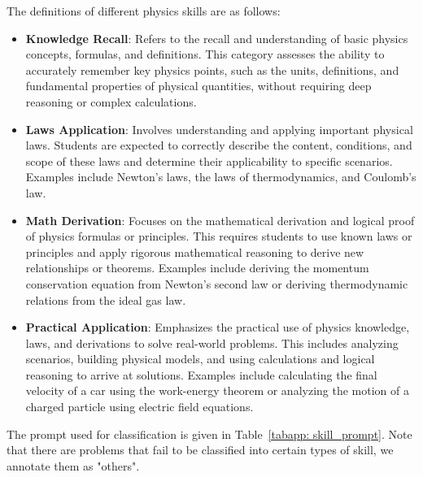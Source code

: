 The definitions of different physics skills are as follows:
\begin{itemize}
    \item \textbf{Knowledge Recall}: Refers to the recall and understanding of basic physics concepts, formulas, and definitions. This category assesses the ability to accurately remember key physics points, such as the units, definitions, and fundamental properties of physical quantities, without requiring deep reasoning or complex calculations.
    \item \textbf{Laws Application}: Involves understanding and applying important physical laws. Students are expected to correctly describe the content, conditions, and scope of these laws and determine their applicability to specific scenarios. Examples include Newton's laws, the laws of thermodynamics, and Coulomb's law.
    \item \textbf{Math Derivation}: Focuses on the mathematical derivation and logical proof of physics formulas or principles. This requires students to use known laws or principles and apply rigorous mathematical reasoning to derive new relationships or theorems. Examples include deriving the momentum conservation equation from Newton's second law or deriving thermodynamic relations from the ideal gas law.
    \item \textbf{Practical Application}: Emphasizes the practical use of physics knowledge, laws, and derivations to solve real-world problems. This includes analyzing scenarios, building physical models, and using calculations and logical reasoning to arrive at solutions. Examples include calculating the final velocity of a car using the work-energy theorem or analyzing the motion of a charged particle using electric field equations.
\end{itemize}

The prompt used for classification is given in Table~\ref{tabapp: skill_prompt}.
Note that there are problems that fail to be classified into certain types of skill, we annotate them as "others".

